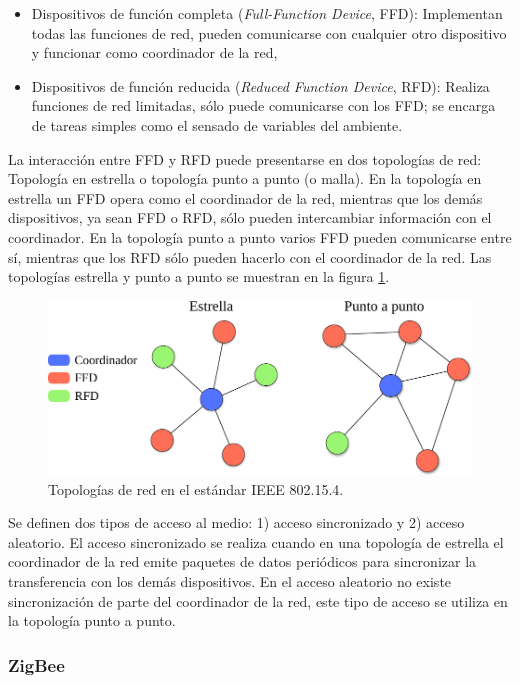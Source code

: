 \begin{itemize}
	\item Dispositivos de función completa (\textit{Full-Function Device}, FFD): Implementan todas las funciones de red, pueden comunicarse con cualquier otro dispositivo y funcionar como coordinador de la red, 
	\item Dispositivos de función reducida (\textit{Reduced Function Device}, RFD): Realiza funciones de red limitadas, sólo puede comunicarse con los FFD; se encarga de tareas simples como el sensado de variables del ambiente. 
\end{itemize}

La interacción entre FFD y RFD puede presentarse en dos topologías de red: Topología en estrella o topología punto a punto (o malla). En la topología en estrella un FFD opera como el coordinador de la red, mientras que los demás dispositivos, ya sean FFD o RFD, sólo pueden intercambiar información con el coordinador. En la topología punto a punto varios FFD pueden comunicarse entre sí, mientras que los RFD sólo pueden hacerlo con el coordinador de la red. Las topolog\'ias estrella y punto a punto se muestran en la figura \ref{img:ieee_topologia}.

\begin{figure}
	\centering
	\includegraphics[scale=0.73]{capitulo_2_imgs/topologias_ieee80215.pdf}
	\caption{Topologías de red en el estándar IEEE 802.15.4.}
	\label{img:ieee_topologia}	
\end{figure}

Se definen dos tipos de acceso al medio: 1) acceso sincronizado y 2) acceso aleatorio. El acceso sincronizado se realiza cuando en una topología de estrella el coordinador de la red emite paquetes de datos periódicos para sincronizar la transferencia con los demás dispositivos. En el acceso aleatorio no existe sincronización de parte del coordinador de la red, este tipo de acceso se utiliza en la topología punto a punto. 

\subsubsection{ZigBee}


